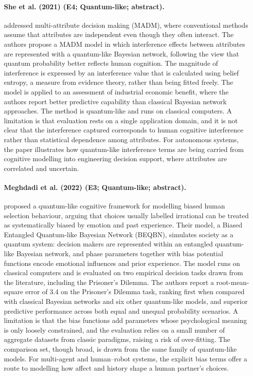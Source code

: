 \documentclass[10pt,a4paper]{article}
\begin{document}
\paragraph{She et al. (2021) (E4; Quantum-like; abstract).} \citet{She2021} addressed multi-attribute decision making (MADM), where conventional methods assume that attributes are independent even though they often interact. The authors propose a MADM model in which interference effects between attributes are represented with a quantum-like Bayesian network, following the view that quantum probability better reflects human cognition. The magnitude of interference is expressed by an interference value that is calculated using belief entropy, a measure from evidence theory, rather than being fitted freely. The model is applied to an assessment of industrial economic benefit, where the authors report better predictive capability than classical Bayesian network approaches. The method is quantum-like and runs on classical computers. A limitation is that evaluation rests on a single application domain, and it is not clear that the interference captured corresponds to human cognitive interference rather than statistical dependence among attributes. For autonomous systems, the paper illustrates how quantum-like interference terms are being carried from cognitive modelling into engineering decision support, where attributes are correlated and uncertain.

\paragraph{Meghdadi et al. (2022) (E3; Quantum-like; abstract).} \citet{Meghdadi2022} proposed a quantum-like cognitive framework for modelling biased human selection behaviour, arguing that choices usually labelled irrational can be treated as systematically biased by emotion and past experience. Their model, a Biased Entangled Quantum-like Bayesian Network (BEQBN), simulates society as a quantum system: decision makers are represented within an entangled quantum-like Bayesian network, and phase parameters together with bias potential functions encode emotional influences and prior experience. The model runs on classical computers and is evaluated on two empirical decision tasks drawn from the literature, including the Prisoner's Dilemma. The authors report a root-mean-square error of 3.4 on the Prisoner's Dilemma task, ranking first when compared with classical Bayesian networks and six other quantum-like models, and superior predictive performance across both equal and unequal probability scenarios. A limitation is that the bias functions add parameters whose psychological meaning is only loosely constrained, and the evaluation relies on a small number of aggregate datasets from classic paradigms, raising a risk of over-fitting. The comparison set, though broad, is drawn from the same family of quantum-like models. For multi-agent and human--robot systems, the explicit bias terms offer a route to modelling how affect and history shape a human partner's choices.
\end{document}
